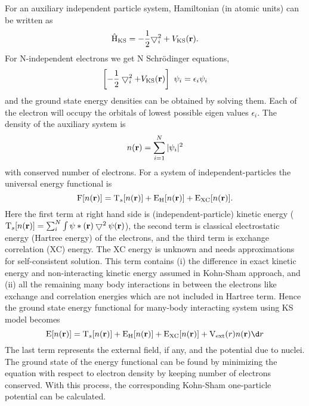 For an auxiliary independent particle system, Hamiltonian (in atomic units) can be written as
\begin{equation}
{\rm\hat{H}}_{\text{KS}} = -\frac{1}{2}{\bigtriangledown_i^2}  + V_{\text{KS}}({\bf r}).
\end{equation}
For N-independent electrons we get N Schr\"odinger equations,
\begin{equation}\label{KS1}
\left[-\frac{1}{2}\bigtriangledown_i^{2}+ V_{\text{KS}}({\bf r})\right]\ \psi_i = \epsilon_i \psi_i
\end{equation}
and the ground state energy densities can be obtained by solving them. Each of the electron will occupy the orbitals of lowest possible eigen values $\epsilon_i$. The density of the auxiliary system is
\begin{equation}
n({\bf r})= \sum_{i=1}^N|\psi_i|^{2}
\label{KS2}
\end{equation}
with conserved number of electrons. For a system of independent-particles the universal energy functional is
\begin{equation*}
{\rm F}[n({\bf r})]= {\rm T}_s[n({\bf r})] + {\rm E}_{\rm H} [n({\bf r})] + {\rm E}_{\rm XC} [n({\bf r})].
\end{equation*}
Here the first term at right hand side is (independent-particle) kinetic energy 
($ {\rm T}_s[n({\bf r})]=\sum_{i}^N \int \psi*({\bf r}) \bigtriangledown^{2} \psi({\bf r})$), the second term is classical electrostatic energy (Hartree energy) of the electrons, and the third term is exchange correlation (XC) energy. The XC energy is unknown and needs approximations for self-consistent solution. This term contains (i) the difference in exact kinetic energy and non-interacting kinetic energy assumed in Kohn-Sham approach, and (ii) all the remaining many body interactions in between the electrons like exchange and correlation energies which are not included in Hartree term. Hence the ground state energy functional for many-body interacting system using KS model becomes
\begin{equation*}
{\rm E}[n({\bf r})]= {\rm T}_s[n({\bf r})] + {\rm E}_{\rm H} [n({\bf r})] + {\rm E}_{\rm XC} [n({\bf r})] + {\rm V}_{\rm ext}(r)n({\bf r})\d r
\end{equation*}
The last term represents the external field, if any, and the potential due to nuclei. The ground state of the energy functional can be found by minimizing the equation with respect to electron density by keeping number of electrons conserved. With this process, the corresponding Kohn-Sham one-particle potential can be calculated.
